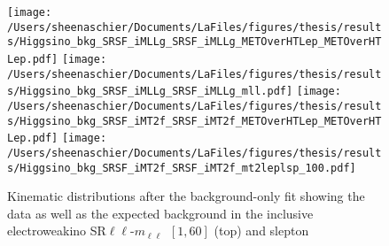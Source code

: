  \begin{figure}%
  \begin{center}
   \texttt{[image: /Users/sheenaschier/Documents/LaFiles/figures/thesis/results/Higgsino\_bkg\_SRSF\_iMLLg\_SRSF\_iMLLg\_METOverHTLep\_METOverHTLep.pdf]}
   \texttt{[image: /Users/sheenaschier/Documents/LaFiles/figures/thesis/results/Higgsino\_bkg\_SRSF\_iMLLg\_SRSF\_iMLLg\_mll.pdf]}
   \texttt{[image: /Users/sheenaschier/Documents/LaFiles/figures/thesis/results/Higgsino\_bkg\_SRSF\_iMT2f\_SRSF\_iMT2f\_METOverHTLep\_METOverHTLep.pdf]}
   \texttt{[image: /Users/sheenaschier/Documents/LaFiles/figures/thesis/results/Higgsino\_bkg\_SRSF\_iMT2f\_SRSF\_iMT2f\_mt2leplsp\_100.pdf]}
   \end{center}
 \caption{Kinematic distributions after the background-only fit showing the data as well as the expected background in the inclusive electroweakino SR$\ell\ell$-$m_{\ell\ell}$~$[1, 60]$ (top) and slepton}%
  \label{fig:SRpostfitplots}
 \end{figure}


